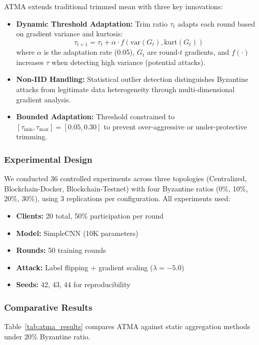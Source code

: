 \documentclass{ieeeaccess}
\begin{document}
ATMA extends traditional trimmed mean with three key innovations:
\begin{itemize}
    \item \textbf{Dynamic Threshold Adaptation:} Trim ratio $\tau_t$ adapts each round based on gradient variance and kurtosis:
    $$\tau_{t+1} = \tau_t + \alpha \cdot f(\text{var}(G_t), \text{kurt}(G_t))$$
    where $\alpha$ is the adaptation rate (0.05), $G_t$ are round-$t$ gradients, and $f(\cdot)$ increases $\tau$ when detecting high variance (potential attacks).
    
    \item \textbf{Non-IID Handling:} Statistical outlier detection distinguishes Byzantine attacks from legitimate data heterogeneity through multi-dimensional gradient analysis.
    
    \item \textbf{Bounded Adaptation:} Threshold constrained to $[\tau_{\min}, \tau_{\max}] = [0.05, 0.30]$ to prevent over-aggressive or under-protective trimming.
\end{itemize}

\subsubsection{Experimental Design}

We conducted 36 controlled experiments across three topologies (Centralized, Blockchain-Docker, Blockchain-Testnet) with four Byzantine ratios (0\%, 10\%, 20\%, 30\%), using 3 replications per configuration. All experiments used:
\begin{itemize}
    \item \textbf{Clients:} 20 total, 50\% participation per round
    \item \textbf{Model:} SimpleCNN (10K parameters)
    \item \textbf{Rounds:} 50 training rounds
    \item \textbf{Attack:} Label flipping + gradient scaling ($\lambda = -5.0$)
    \item \textbf{Seeds:} 42, 43, 44 for reproducibility
\end{itemize}

\subsubsection{Comparative Results}

Table~\ref{tab:atma_results} compares ATMA against static aggregation methods under 20\% Byzantine ratio.
\end{document}
